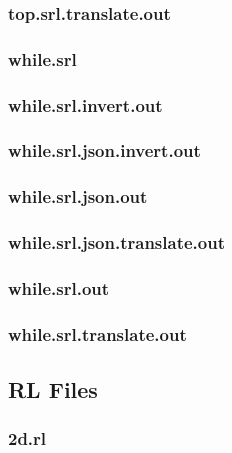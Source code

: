 \subsubsection{top.srl.translate.out}
\label{app:top_srl.translate.out}

\subsubsection{while.srl}
\label{app:while_srl}

\subsubsection{while.srl.invert.out}
\label{app:while_srl.invert.out}

\subsubsection{while.srl.json.invert.out}
\label{app:while_srl.json.invert.out}

\subsubsection{while.srl.json.out}
\label{app:while_srl.json.out}

\subsubsection{while.srl.json.translate.out}
\label{app:while_srl.json.translate.out}

\subsubsection{while.srl.out}
\label{app:while_srl.out}

\subsubsection{while.srl.translate.out}
\label{app:while_srl.translate.out}

\subsection{RL Files}
\label{app:test_rl_files}
\subsubsection{2d.rl}
\label{app:2d_rl}

